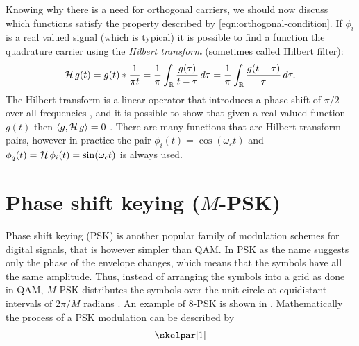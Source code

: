 Knowing why there is a need for orthogonal carriers, we should now discuss which functions satisfy the property described by \eqref{eqn:orthogonal-condition}. If \(\phi_i\) is a real valued signal (which is typical) it is possible to find a function the quadrature carrier using the \emph{Hilbert transform} (sometimes called Hilbert filter):
\begin{equation}
	\operatorname{\mathcal{H}} g(t) = g(t) * \frac{1}{\pi t}
		= \frac{1}{\pi} \int_\mathbb{R} \frac{g(\tau)}{t - \tau} \,d\tau
		= \frac{1}{\pi} \int_\mathbb{R} \frac{g(t - \tau)}{\tau} \,d\tau.
\end{equation}
The Hilbert transform is a linear operator that introduces a phase shift of \(\pi / 2\) over all frequencies \cite{Hsu,Gallager}, and it is possible to show that given a real valued function \(g(t)\) then \(\langle g, \operatorname{\mathcal{H}} g \rangle = 0\) \cite{Kschischang,Kneubuehler}. There are many functions that are Hilbert transform pairs, however in practice the pair \(\phi_i(t) = \cos(\omega_c t)\) and \(\phi_q(t) = \operatorname{\mathcal{H}} \phi_i(t) = \sin(\omega_c t)\) is always used.



\section{Phase shift keying (\(M\)-PSK)}

Phase shift keying (PSK) is another popular family of modulation schemes for digital signals, that is however simpler than QAM. In PSK as the name suggests only the phase of the envelope changes, which means that the symbols have all the same amplitude. Thus, instead of arranging the symbols into a grid as done in QAM, \(M\)-PSK distributes the symbols over the unit circle at equidistant intervals of \(2\pi / M\) radians \cite{Mathis,Kneubuehler}. An example of 8-PSK is shown in . Mathematically the process of a PSK modulation can be described by \skelpar[2]
\begin{equation}
	\skelpar[1]
\end{equation}
\skelpar[3]


